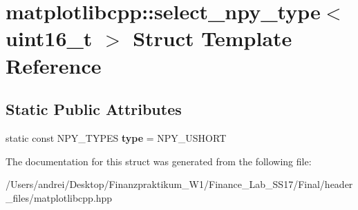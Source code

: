 \hypertarget{structmatplotlibcpp_1_1select__npy__type_3_01uint16__t_01_4}{}\section{matplotlibcpp\+:\+:select\+\_\+npy\+\_\+type$<$ uint16\+\_\+t $>$ Struct Template Reference}
\label{structmatplotlibcpp_1_1select__npy__type_3_01uint16__t_01_4}
\subsection*{Static Public Attributes}
\begin{DoxyCompactItemize}
\item 
\mbox{\label{structmatplotlibcpp_1_1select__npy__type_3_01uint16__t_01_4_aca209b33cc0bcaad16c01bff097a075f}} 
static const N\+P\+Y\+\_\+\+T\+Y\+P\+ES {\bfseries type} = N\+P\+Y\+\_\+\+U\+S\+H\+O\+RT
\end{DoxyCompactItemize}


The documentation for this struct was generated from the following file\+:\begin{DoxyCompactItemize}
\item 
/\+Users/andrei/\+Desktop/\+Finanzpraktikum\+\_\+\+W1/\+Finance\+\_\+\+Lab\+\_\+\+S\+S17/\+Final/header\+\_\+files/matplotlibcpp.\+hpp\end{DoxyCompactItemize}
